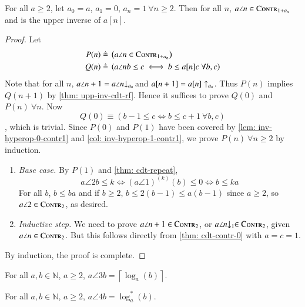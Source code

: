 \begin{thm}
For all $a\ge 2$, let $a_0 = a$, $a_1 = 0$, $a_n = 1 \ \forall n\ge 2$. Then for all $n$, $a\angle{n} \in \text{\scshape{Contr}}_{1+a_n}$ and is the upper inverse of $a[n]$.
\end{thm}
\begin{proof}
Let
$$\begin{aligned}
P(n) \triangleq & \ \left(a\angle{n} \in \contract_{1+a_n}\right)\\
Q(n) \triangleq & \ \left(a\angle{n}b \le c \iff b\le a[n]c \ \forall b, c\right)
\end{aligned}$$
Note that for all $n$, $a\angle{n+1} = \cdt{a\angle{n}}{a_n}$ and $a[n+1] = a[n]\uparrow_{a_n}$. Thus $P(n)$ implies $Q(n+1)$ by \cref{thm: upp-inv-cdt-rf}. Hence it suffices to prove $Q(0)$ and $P(n)\ \forall n$. Now
$$ Q(0) \equiv \left(b - 1 \le c \iff b\le  c + 1 \ \forall b, c\right) $$
, which is trivial. Since $P(0)$ and $P(1)$ have been covered by \cref{lem: inv-hyperop-0-contr1} and \cref{col: inv-hyperop-1-contr1}, we prove $P(n)\ \forall n\ge 2$ by induction.
\begin{enumerate}[leftmargin=*]
	\item \textit{Base case.} By $P(1)$ and \cref{thm: cdt-repeat},
	$$ a\angle{2}b \le k \iff \left(a\angle{1}\right)^{(k)}(b) \le 0 \iff b \le ka $$
	For all $b$, $b\le ba$ and if $b\ge 2$, $b \le 2(b-1)\le a(b-1)$ since $a\ge 2$, so $a\angle{2} \in \text{\scshape{Contr}}_2$, as desired.
	\item \textit{Inductive step.} We need to prove $a\angle{n+1}\in \text{\scshape{Contr}}_2$, or $\cdt{a\angle{n}}{1} \ \in \contract_2$, given $a\angle{n}\in \text{\scshape{Contr}}_2$. But this follows directly from \cref{thm: cdt-contr-0} with $a = c = 1$.
\end{enumerate}
By induction, the proof is complete.
\end{proof}

\begin{col}
For all $a, b\in \mathbb{N}$, $a\ge 2$, $a\angle{3}b = \displaystyle \left\lceil \log_a(b) \right\rceil$.
\end{col}

\begin{col}
For all $a, b\in \mathbb{N}$, $a\ge 2$, $a\angle{4}b = \log^*_a(b) $.
\end{col}